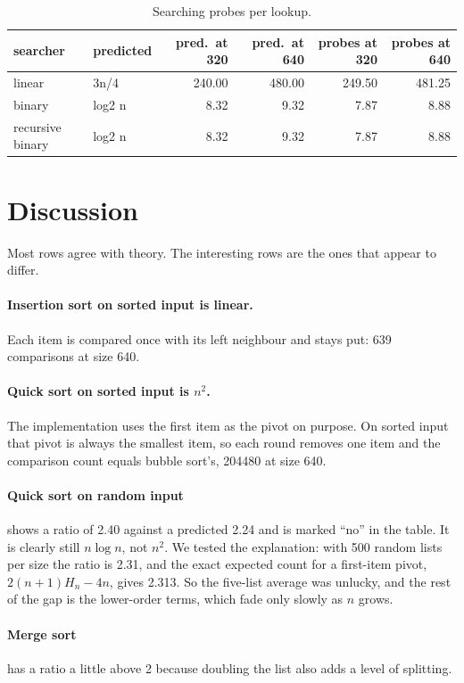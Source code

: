 \documentclass[11pt]{article}
\begin{document}
\begin{table}[ht]
\centering
\small
\begin{tabular}{llrrrr}
\toprule
searcher & predicted & pred.\ at 320 & pred.\ at 640 & probes at 320 & probes at 640 \\
\midrule
linear & 3n/4 & 240.00 & 480.00 & 249.50 & 481.25 \\
binary & log2 n & 8.32 & 9.32 & 7.87 & 8.88 \\
recursive binary & log2 n & 8.32 & 9.32 & 7.87 & 8.88 \\
\bottomrule
\end{tabular}
\caption{Searching probes per lookup.}
\label{tab:search}
\end{table}

\section{Discussion}
Most rows agree with theory. The interesting rows are the ones that appear to differ.

\paragraph{Insertion sort on sorted input is linear.} Each item is compared once with its left neighbour and stays put: 639 comparisons at size 640.

\paragraph{Quick sort on sorted input is $n^2$.} The implementation uses the first item as the pivot on purpose. On sorted input that pivot is always the smallest item, so each round removes one item and the comparison count equals bubble sort's, 204480 at size 640.

\paragraph{Quick sort on random input} shows a ratio of 2.40 against a predicted 2.24 and is marked ``no'' in the table. It is clearly still $n \log n$, not $n^2$. We tested the explanation: with 500 random lists per size the ratio is 2.31, and the exact expected count for a first-item pivot, $2(n+1)H_n-4n$, gives 2.313. So the five-list average was unlucky, and the rest of the gap is the lower-order terms, which fade only slowly as $n$ grows.

\paragraph{Merge sort} has a ratio a little above 2 because doubling the list also adds a level of splitting.
\end{document}

